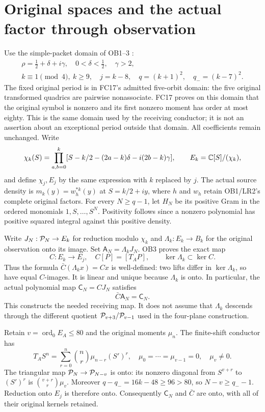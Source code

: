 \section{Original spaces and the actual factor through observation}
Use the simple-packet domain of OB1--3 \cite{eightmin:OB}:
\[
 \begin{gathered}
 \rho=\tfrac12+\delta+i\gamma,\quad0<\delta<\tfrac12,\quad\gamma>2,\\
 k\equiv1\pmod4,\ k\ge9,\quad j=k-8,\quad
 q=(k+1)^2,\quad q_-=(k-7)^2.
 \end{gathered}
\]
The fixed original period is in FC17's admitted five-orbit domain:
the five original transformed quadrics are pairwise nonassociate.
FC17 proves on this domain that the original symbol is nonzero and
its first nonzero moment has order at most eighty. This is the same
domain used by the receiving conductor; it is not an assertion about
an exceptional period outside that domain. All coefficients remain
unchanged. Write
\[
 \chi_k(S)=\prod_{a,b=0}^k
 [S-k/2-(2a-k)\delta-i(2b-k)\gamma],\qquad
 E_k=\mathbb C[S]/(\chi_k),
\]
and define $\chi_j,E_j$ by the same expression with $k$ replaced by $j$.
The actual source density is $m_k(y)=w_h^{*k}(y)$ at $S=k/2+iy$,
where $h$ and $w_h$ retain OB1/LR2's complete original factors.
For every $N\ge q-1$, let $H_N$ be its positive Gram in the ordered
monomials $1,S,\ldots,S^N$. Positivity follows since a nonzero
polynomial has positive squared integral against this positive density.

Write $J_N:\mathcal P_N\to E_k$ for reduction modulo $\chi_k$ and
$\Lambda_k:E_k\to B_k$ for the original observation onto its image.
Set $\mathsf A_N=\Lambda_kJ_N$. OB3 proves the exact map
\[
 C:E_k\longrightarrow E_j,\quad C[P]=[T_AP],\qquad
 \ker\Lambda_k\subset\ker C.                                      \tag{EQ1}
\]
Thus the formula $\bar C(\Lambda_kx)=Cx$ is well-defined: two lifts
differ in $\ker\Lambda_k$, so have equal $C$-images. It is linear
and unique because $\Lambda_k$ is onto. In particular, the actual
polynomial map $\mathsf C_N=CJ_N$ satisfies
\[
 \bar C\mathsf A_N=\mathsf C_N.                                    \tag{EQ2}
\]
This constructs the needed receiving map. It does not assume that
$\Lambda_k$ descends through the different quotient
$\mathcal P_{v+3}/\mathcal P_{v-1}$ used in the four-plane construction.

Retain $v=\operatorname{ord}_0E_A\le80$ and the original moments
$\mu_n$. The finite-shift conductor has
\[
 T_A S^n=\sum_{r=0}^n\binom nr\mu_{n-r}(S')^r,
 \quad\mu_0=\cdots=\mu_{v-1}=0,\quad\mu_v\ne0.                    \tag{EQ3}
\]
The triangular map $\mathcal P_N\to\mathcal P_{N-v}$ is onto: its nonzero
diagonal from $S^{v+r}$ to $(S')^r$ is
$\binom{v+r}{r}\mu_v$. Moreover
$q-q_-=16k-48\ge96>80$, so $N-v\ge q_--1$.
Reduction onto $E_j$ is therefore onto. Consequently $\mathsf C_N$
and $\bar C$ are onto, with all of their original kernels retained.

